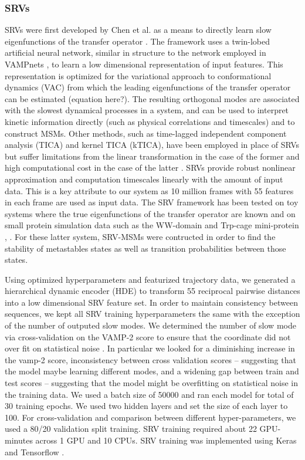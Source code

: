 \documentclass[journal=jpcbfk,manuscript=article]{achemso}
\begin{document}
\subsubsection{\label{sec:methods}SRVs}
 
SRVs were first developed by Chen et al. as a means to directly learn slow eigenfunctions of the transfer operator \citep{Chen}. The framework uses a twin-lobed artificial neural network, similar in structure to the network employed in VAMPnets \citep{Mardt2018VAMPnetsKinetics}, to learn a low dimensional representation of input features. This representation is optimized for the variational approach to conformational dynamics (VAC) from which the leading eigenfunctions of the transfer operator can be estimated (equation here?). The resulting orthogonal modes are associated with the slowest dynamical processes in a system, and can be used to interpret kinetic information directly (such as physical correlations and timescales) and to construct MSMs. Other methods, such as time-lagged independent component analysis (TICA) and kernel TICA (kTICA), have been employed in place of SRVs but suffer limitations from the linear transformation in the case of the former and high computational cost in the case of the latter \citep{Harrigan2017LandmarkDynamics}. SRVs provide robust nonlinear approximation and computation timescales linearly with the amount of input data. This is a key attribute to our system as 10 million frames with 55 features in each frame are used as input data. The SRV framework has been tested on toy systems where the true eigenfunctions of the transfer operator are known and on small protein simulation data such as the WW-domain and Trp-cage mini-protein \citep{Chen}, \citep{Sidky}. For these latter system, SRV-MSMs were contructed in order to find the stability of metastables states as well as transition probabilities between those states.

Using optimized hyperparameters and featurized trajectory data, we generated a hierarchical dynamic encoder (HDE) to transform 55 reciprocal pairwise distances into a low dimensional SRV feature set. In order to maintain consistency between sequences, we kept all SRV training hyperparameters the same with the exception of the number of outputed slow modes. We determined the number of slow mode via cross-validation on the VAMP-2 score to ensure that the coordinate did not over fit on statistical noise \citep{McGibbon2015VariationalKinetics}. In particular we looked for a diminishing increase in the vamp-2 score, inconsistency between cross validation scores -- suggesting that the model maybe learning different modes, and a widening gap between train and test scores -- suggesting that the model might be overfitting on statistical noise in the training data. We used a batch size of 50000 and ran each model for total of 30 training epochs. We used two hidden layers and set the size of each layer to 100. For cross-validation and comparison between different hyper-parameters, we used a 80/20 validation split training. SRV training required about 22 GPU-minutes across 1 GPU and 10 CPUs. SRV training was implemented using Keras and Tensorflow \citep{KerasGithub.Com} \citep{Abadi2016TensorFlow:Systems}.
\end{document}
